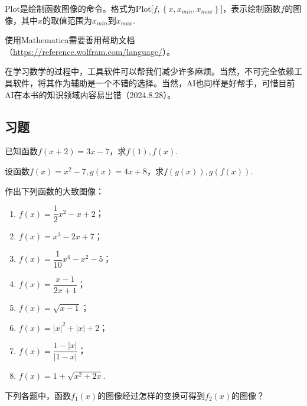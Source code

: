 \documentclass[lang=cn,math=cm,chinesefont=nofont,11pt,scheme=chinese,onecol]{elegantbook}
\begin{document}
\begin{remark}
  Plot是绘制函数图像的命令。格式为Plot[$f,\left\{x,x_{min},x_{max}\right\}$]，表示绘制函数$f$的图像，其中$x$的取值范围为$x_{min}$到$x_{max}$.
\end{remark}

使用Mathematica需要善用帮助文档（\href{https://reference.wolfram.com/language/}{https://reference.wolfram.com/language/}）。

在学习数学的过程中，工具软件可以帮我们减少许多麻烦。当然，不可完全依赖工具软件，将其作为辅助是一个不错的选择。当然，AI也同样是好帮手，可惜目前AI在本书的知识领域内容易出错（2024.8.28）。

\subsection{习题}

\begin{exercise}\label{2017RJB.P94.8.changed}
  已知函数$f(x+2)=3x-7$，求$f(1),f(x)$.
\end{exercise}

\begin{exercise}
  设函数$f(x)=x^2-7,g(x)=4x+8$，求$f(g(x)),g(f(x))$.
\end{exercise}

\begin{exercise}
  作出下列函数的大致图像：
\end{exercise}

\begin{spacing}{1.8}
  \begin{enumerate}
    \item $f(x)=\dfrac12 x^2-x+2$；
    \item $f(x)=x^3-2x+7$；
    \item $f(x)=\dfrac{1}{10}x^4-x^2-5$；
    \item $f(x)=\dfrac{x-1}{2x+1}$；
    \item $f(x)=\sqrt{x-1}$；
    \item $f(x)=\left|x\right|^2+\left|x\right|+2$；
    \item $f(x)=\dfrac{1-\left|x\right|}{\left|1-x\right|}$；
    \item $f(x)=1+\sqrt{x^{2}+2x}$.
  \end{enumerate}
\end{spacing}

\begin{exercise}\label{BJSZ.Algebra1.P58-59.changed}
  下列各题中，函数$f_1(x)$的图像经过怎样的变换可得到$f_2(x)$的图像？
\end{exercise}
\end{document}
